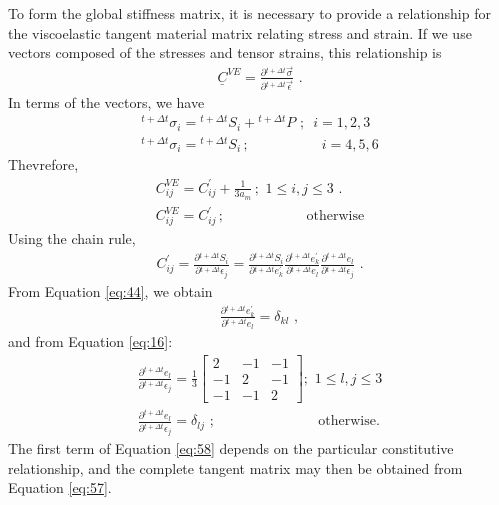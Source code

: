 To form the global stiffness matrix, it is necessary to provide a
relationship for the viscoelastic tangent material matrix relating
stress and strain. If we use vectors composed of the stresses and
tensor strains, this relationship is
\begin{gather}
\underline{C}^{VE}=\frac{\partial\phantom{}^{t+\Delta t}\overrightarrow{\sigma}}{\partial\phantom{}^{t+\Delta t}\overrightarrow{\epsilon}}\,\,.\label{eq:55}
\end{gather}
In terms of the vectors, we have
\begin{gather}
^{t+\Delta t}\sigma_{i}=\phantom{}^{t+\Delta t}S_{i}+\phantom{}^{t+\Delta t}P\,\,;\,\,\, i=1,2,3\label{eq:56}\\
^{t+\Delta t}\sigma_{i}=\phantom{}^{t+\Delta t}S_{i}\,;\,\,\,\,\,\,\,\,\,\,\,\,\,\,\,\,\,\,\,\,\,\,\,\,\,\,\,\,\,\,\, i=4,5,6\nonumber 
\end{gather}
Thevrefore,
\begin{gather}
C_{ij}^{VE}=C_{ij}^{\prime}+\frac{1}{3a_{m}}\,;\,\,1\leq i,j\leq3\,\,.\label{eq:57}\\
C_{ij}^{VE}=C_{ij}^{\prime}\,;\,\,\,\,\,\,\,\,\,\,\,\,\,\,\,\,\,\,\,\,\,\,\,\,\,\,\,\,\,\,\,\,\,\,\,\textrm{otherwise}\nonumber 
\end{gather}
Using the chain rule,
\begin{gather}
C_{ij}^{\prime}=\frac{\partial\phantom{}^{t+\Delta t}S_{i}}{\partial\phantom{}^{t+\Delta t}\epsilon_{j}}=\frac{\partial\phantom{}^{t+\Delta t}S_{i}}{\partial\phantom{}^{t+\Delta t}e_{k}^{\prime}}\frac{\partial\phantom{}^{t+\Delta t}e_{k}^{\prime}}{\partial\phantom{}^{t+\Delta t}e_{l}}\frac{\partial\phantom{}^{t+\Delta t}e_{l}}{\partial\phantom{}^{t+\Delta t}\epsilon_{j}}\,\,.\label{eq:58}
\end{gather}
From Equation \vref{eq:44}, we obtain
\begin{gather}
\frac{\partial\phantom{}^{t+\Delta t}e_{k}^{\prime}}{\partial\phantom{}^{t+\Delta t}e_{l}}=\delta_{kl}\,\,,\label{eq:59}
\end{gather}
and from Equation \vref{eq:16}:
\begin{gather}
\frac{\partial\phantom{}^{t+\Delta t}e_{l}}{\partial\phantom{}^{t+\Delta t}\epsilon_{j}}=\frac{1}{3}\left[\begin{array}{ccc}
2 & -1 & -1\\
-1 & 2 & -1\\
-1 & -1 & 2
\end{array}\right];\,\,1\leq l,j\leq3\label{eq:60}\\
\frac{\partial\phantom{}^{t+\Delta t}e_{l}}{\partial\phantom{}^{t+\Delta t}\epsilon_{j}}=\delta_{lj}\,\,;\,\,\,\,\,\,\,\,\,\,\,\,\,\,\,\,\,\,\,\,\,\,\,\,\,\,\,\,\,\,\,\,\,\,\,\,\,\,\,\,\,\,\,\,\textrm{otherwise.}\nonumber 
\end{gather}
The first term of Equation \vref{eq:58} depends on the particular
constitutive relationship, and the complete tangent matrix may then
be obtained from Equation \vref{eq:57}.


